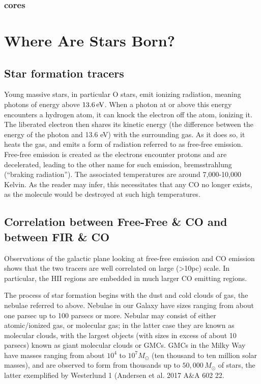 \documentclass[../dissertation.tex]{subfiles}
\begin{document}
\subsubsection{cores}










\section{Where Are Stars Born?}

\subsection{Star formation tracers}

Young massive stars, in particular O stars, emit ionizing radiation, meaning photons of energy above $13.6 \,{\rm eV}$. 
When a photon at or above this energy encounters a hydrogen atom, it can knock the electron off the atom, ionizing it. 
The liberated electron then shares its kinetic energy (the difference between the energy of the photon and 13.6 eV) with the surrounding gas. 
As it does so, it heats the gas, and emits a form of radiation referred to as free-free emission. 
Free-free emission is created as the electrons encounter protons and are decelerated, leading to the other name for such emission, bremsstrahlung (``braking radiation''). 
The associated temperatures are around 7,000-10,000 Kelvin. 
As the reader may infer, this necessitates that any CO no longer exists, as the molecule would be destroyed at such high temperatures.

\subsection{Correlation between Free-Free \& CO and between FIR \& CO}

Observations of the galactic plane looking at free-free emission and CO emission shows that the two tracers are well correlated on large (>10pc) scale. In particular, the HII regions are embedded in much larger CO emitting regions. 

The process of star formation begins with the dust and cold clouds of gas, the nebulae referred to above. 
Nebulae in our Galaxy have sizes ranging from about one parsec up to 100 parsecs or more. 
Nebular may consist of either atomic/ionized gas, or molecular gas; 
in the latter case they are known as molecular clouds, with the largest objects (with sizes in excess of about 10 parsecs) known as giant molecular clouds or GMCs. 
GMCs in the Milky Way have masses ranging from about $10^4$ to $10^7M_\odot$ (ten thousand to ten million solar masses), 
and are observed to form from thousands up to $50,000\,M_\odot$ of stars, the latter exemplified by Westerlund 1 (Andersen et al. 2017 A\&A 602 22.
\end{document}

